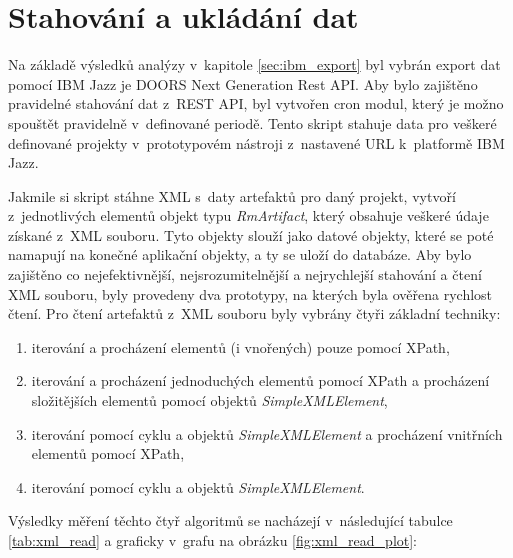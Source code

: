 \documentclass[czech,master]{diploma}
\begin{document}
\section{Stahování a ukládání dat}
Na základě výsledků analýzy v~kapitole \ref{sec:ibm_export} byl vybrán export dat pomocí IBM Jazz je  DOORS Next Generation Rest API. Aby bylo zajištěno pravidelné stahování dat z~REST API, byl vytvořen cron modul, který je možno spouštět pravidelně v~definované periodě. Tento skript stahuje data pro veškeré definované projekty v~prototypovém nástroji z~nastavené URL k~platformě IBM Jazz.

Jakmile si skript stáhne XML s~daty artefaktů pro daný projekt, vytvoří z~jednotlivých elementů objekt typu \textit{RmArtifact}, který obsahuje veškeré údaje získané z~XML souboru. Tyto objekty slouží jako datové objekty, které se poté namapují na konečné aplikační objekty, a ty se uloží do databáze. Aby bylo zajištěno co nejefektivnější, nejsrozumitelnější a nejrychlejší stahování a čtení XML souboru, byly provedeny dva prototypy, na kterých byla ověřena rychlost čtení. Pro čtení artefaktů z~XML souboru byly vybrány čtyři základní techniky:

\begin{enumerate}
\item iterování a procházení elementů (i vnořených) pouze pomocí XPath,
\item iterování a procházení jednoduchých elementů pomocí XPath a procházení složitějších elementů pomocí objektů \textit{SimpleXMLElement},
\item iterování pomocí cyklu a objektů \textit{SimpleXMLElement} a procházení vnitřních elementů pomocí XPath,
\item iterování pomocí cyklu a objektů \textit{SimpleXMLElement}.
\end{enumerate}

Výsledky měření těchto čtyř algoritmů se nacházejí v~následující tabulce \ref{tab:xml_read} a graficky v~grafu na obrázku \ref{fig:xml_read_plot}:
\end{document}

